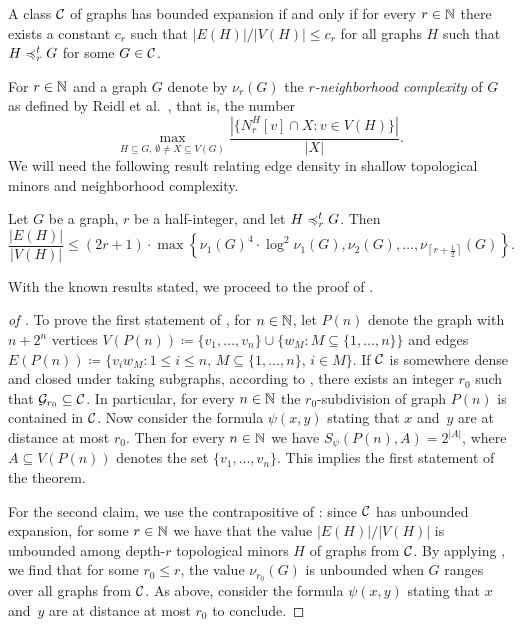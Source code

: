 \begin{lemma}\label{lem:top-bnd-exp}
A class $\mathcal{C}$ of graphs has bounded expansion if and only 
if for every $r\in \mathbb{N}$ there exists a constant $c_r$ such that $|E(H)|/|V(H)|\leq c_r$ for all graphs $H$ such that $H\preccurlyeq_r^tG $ for some $G\in \mathcal{C}$.
\end{lemma}

For $r\in \mathbb{N}$ and a graph $G$ denote by $\nu_r(G)$ the
\emph{$r$-neighborhood complexity} of $G$ as defined
by Reidl et al.~\cite{reidl2016characterising}, that is, the number 
\[\max_{H\subseteq G,\,\emptyset\neq X\subseteq V(G)}\frac{|\{N_r^H[v]\cap X : v\in V(H)\}|}{|X|}.\] 
We will need the following result relating edge density in shallow topological minors and neighborhood complexity.

\begin{lemma}\label{lem:lower-be}
Let $G$ be a graph, $r$ be a half-integer, 
and let $H\preccurlyeq_r^tG$. 
Then 
$$\frac{|E(H)|}{|V(H)|}\leq (2r + 1)\cdot \max \left\{\nu_1(G)^4\cdot \log^2\nu_1(G),\nu_2(G),\ldots, \nu_{\left\lceil r+\frac{1}{2}\right\rceil}(G)\right\}.$$
\end{lemma}

With the known results stated, we proceed to the proof of .

\begin{proof}[of ]
To prove the first statement of , 
for $n\in \mathbb{N}$, let $P(n)$ denote the graph with $n+2^n$ 
vertices $V(P(n))\coloneqq \{v_1,\ldots, v_n\}\cup \{w_M \colon M\subseteq \{1,\ldots, n\}\}$ and edges $E(P(n))\coloneqq \{v_iw_M \colon 1\leq i\leq n,\, M\subseteq \{1,\ldots, n\},\, i\in M\}$. 
If $\mathcal{C}$ is somewhere dense and closed under taking subgraphs, 
according to , there exists an integer $r_0$ 
such that $\mathcal{G}_{r_0}\subseteq \mathcal{C}$. In particular, for every $n\in \mathbb{N}$ the $r_0$-subdivision of graph $P(n)$ is contained in $\mathcal{C}$.
Now consider 
the formula $\psi(x,y)$ stating that $x$ and~$y$ are at distance at most $r_0$. Then for every $n\in \mathbb{N}$ we have 
$S_\psi(P(n),A)=2^{|A|}$, where $A\subseteq V(P(n))$ denotes the set $\{v_1,\ldots, v_n\}$. This implies the first statement
of the theorem.

For the second claim, we use the contrapositive of : since $\mathcal{C}$ has unbounded expansion, for some $r\in \mathbb{N}$ 
we have that the value $|E(H)|/|V(H)|$ is unbounded among depth-$r$ topological minors $H$ of graphs from $\mathcal{C}$.
By applying , we find that for some $r_0\leq r$, the value
$\nu_{r_0}(G)$ is unbounded when $G$ ranges over all graphs from $\mathcal{C}$. 
As above, consider the formula $\psi(x,y)$ stating that $x$ and~$y$ are at distance at most $r_0$ to conclude. 
\end{proof}

